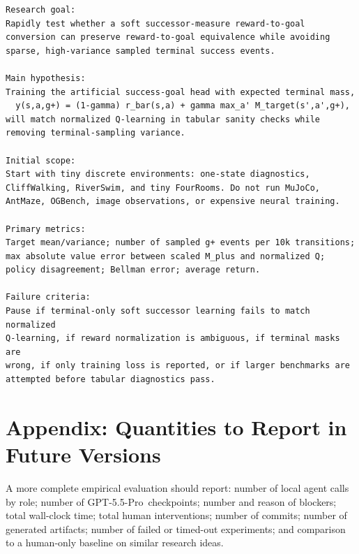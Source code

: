\documentclass{article}
\newcommand{\gptpro}{GPT-5.5-Pro}
\begin{document}
\begin{verbatim}
Research goal:
Rapidly test whether a soft successor-measure reward-to-goal
conversion can preserve reward-to-goal equivalence while avoiding
sparse, high-variance sampled terminal success events.

Main hypothesis:
Training the artificial success-goal head with expected terminal mass,
  y(s,a,g+) = (1-gamma) r_bar(s,a) + gamma max_a' M_target(s',a',g+),
will match normalized Q-learning in tabular sanity checks while
removing terminal-sampling variance.

Initial scope:
Start with tiny discrete environments: one-state diagnostics,
CliffWalking, RiverSwim, and tiny FourRooms. Do not run MuJoCo,
AntMaze, OGBench, image observations, or expensive neural training.

Primary metrics:
Target mean/variance; number of sampled g+ events per 10k transitions;
max absolute value error between scaled M_plus and normalized Q;
policy disagreement; Bellman error; average return.

Failure criteria:
Pause if terminal-only soft successor learning fails to match normalized
Q-learning, if reward normalization is ambiguous, if terminal masks are
wrong, if only training loss is reported, or if larger benchmarks are
attempted before tabular diagnostics pass.
\end{verbatim}

\section{Appendix: Quantities to Report in Future Versions}

A more complete empirical evaluation should report: number of local agent calls by role; number of \gptpro\ checkpoints; number and reason of blockers; total wall-clock time; total human interventions; number of commits; number of generated artifacts; number of failed or timed-out experiments; and comparison to a human-only baseline on similar research ideas.
\end{document}
